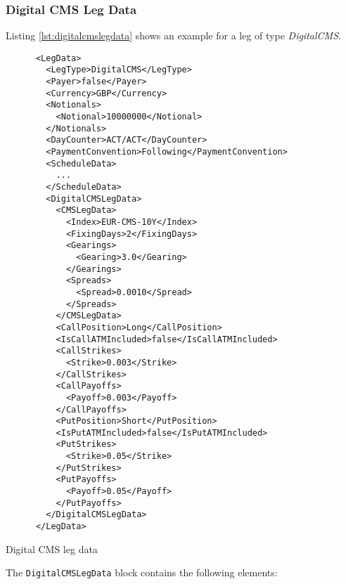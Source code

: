 \subsubsection{Digital CMS Leg Data}
\label{ss:digitalcmslegdata}

Listing \ref{lst:digitalcmslegdata} shows an example for a leg of type \emph{DigitalCMS}.

\begin{listing}[H]
\begin{verbatim}
      <LegData>
        <LegType>DigitalCMS</LegType>
        <Payer>false</Payer>
        <Currency>GBP</Currency>
        <Notionals>
          <Notional>10000000</Notional>
        </Notionals>
        <DayCounter>ACT/ACT</DayCounter>
        <PaymentConvention>Following</PaymentConvention>
        <ScheduleData>
          ...
        </ScheduleData>
        <DigitalCMSLegData>
          <CMSLegData>
            <Index>EUR-CMS-10Y</Index>
            <FixingDays>2</FixingDays>
            <Gearings>
              <Gearing>3.0</Gearing>
            </Gearings>
            <Spreads>
              <Spread>0.0010</Spread>
            </Spreads>
          </CMSLegData>
          <CallPosition>Long</CallPosition>
          <IsCallATMIncluded>false</IsCallATMIncluded>
          <CallStrikes>
            <Strike>0.003</Strike>
          </CallStrikes>
          <CallPayoffs>
            <Payoff>0.003</Payoff>
          </CallPayoffs>
          <PutPosition>Short</PutPosition>
          <IsPutATMIncluded>false</IsPutATMIncluded>
          <PutStrikes>
            <Strike>0.05</Strike>
          </PutStrikes>
          <PutPayoffs>
            <Payoff>0.05</Payoff>
          </PutPayoffs>
        </DigitalCMSLegData>
      </LegData>
\end{verbatim}
\caption{Digital CMS leg data}
\label{lst:digitalcmslegdata}
\end{listing}

The \lstinline!DigitalCMSLegData! block contains the following elements:

